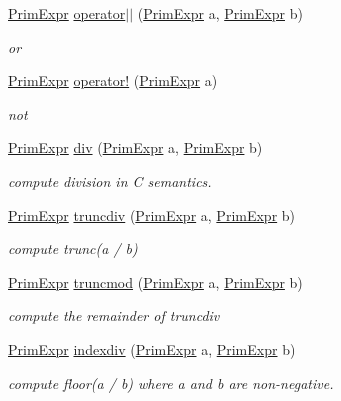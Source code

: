 \begin{DoxyCompactItemize}
\hyperlink{classtvm_1_1PrimExpr}{Prim\+Expr} \hyperlink{namespacetvm_ac3bf2ef3556c995846dddcd84e5db8a6}{operator$\vert$$\vert$} (\hyperlink{classtvm_1_1PrimExpr}{Prim\+Expr} a, \hyperlink{classtvm_1_1PrimExpr}{Prim\+Expr} b)
\begin{DoxyCompactList}\small\item\em or \end{DoxyCompactList}\item 
\hyperlink{classtvm_1_1PrimExpr}{Prim\+Expr} \hyperlink{namespacetvm_ab354bf1270121abea71fade83f13b0b0}{operator!} (\hyperlink{classtvm_1_1PrimExpr}{Prim\+Expr} a)
\begin{DoxyCompactList}\small\item\em not \end{DoxyCompactList}\item 
\hyperlink{classtvm_1_1PrimExpr}{Prim\+Expr} \hyperlink{namespacetvm_a40fcc9952e1ff01a76f3b75dbd368fc1}{div} (\hyperlink{classtvm_1_1PrimExpr}{Prim\+Expr} a, \hyperlink{classtvm_1_1PrimExpr}{Prim\+Expr} b)
\begin{DoxyCompactList}\small\item\em compute division in C semantics. \end{DoxyCompactList}\item 
\hyperlink{classtvm_1_1PrimExpr}{Prim\+Expr} \hyperlink{namespacetvm_a7bcbff6b886a4fa59b65e7cf05714b49}{truncdiv} (\hyperlink{classtvm_1_1PrimExpr}{Prim\+Expr} a, \hyperlink{classtvm_1_1PrimExpr}{Prim\+Expr} b)
\begin{DoxyCompactList}\small\item\em compute trunc(a / b) \end{DoxyCompactList}\item 
\hyperlink{classtvm_1_1PrimExpr}{Prim\+Expr} \hyperlink{namespacetvm_ae3fd62ca6008d6f20e4845426ec47aa6}{truncmod} (\hyperlink{classtvm_1_1PrimExpr}{Prim\+Expr} a, \hyperlink{classtvm_1_1PrimExpr}{Prim\+Expr} b)
\begin{DoxyCompactList}\small\item\em compute the remainder of truncdiv \end{DoxyCompactList}\item 
\hyperlink{classtvm_1_1PrimExpr}{Prim\+Expr} \hyperlink{namespacetvm_a8203d70a5ebf3532370264b000d0d276}{indexdiv} (\hyperlink{classtvm_1_1PrimExpr}{Prim\+Expr} a, \hyperlink{classtvm_1_1PrimExpr}{Prim\+Expr} b)
\begin{DoxyCompactList}\small\item\em compute floor(a / b) where a and b are non-\/negative. \end{DoxyCompactList}\item 

\end{DoxyCompactItemize}
